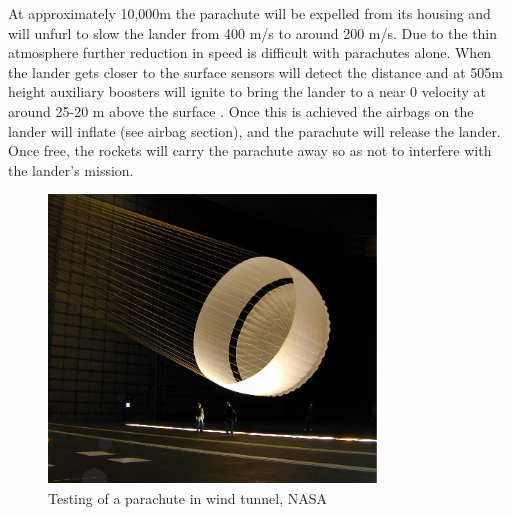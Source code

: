 \documentclass[%
 portrait,
 aapm,
 mph,%
 amsmath,amssymb,
 reprint,%
]{revtex4-2}
\begin{document}
At approximately 10,000m the parachute will be expelled from its housing and will unfurl to slow the lander from 400 m/s to around 200 m/s.  Due to the thin atmosphere further reduction in speed is difficult with parachutes alone.  When the lander gets closer to the surface sensors will detect the distance and at 505m height auxiliary boosters will ignite to bring the lander to a near 0 velocity at around 25-20 m above the surface \cite{NASAMarsExplorationRovers:002}.  Once this is achieved the airbags on the lander will inflate (see airbag section), and the parachute will release the lander.  Once free, the rockets will carry the parachute away so as not to interfere with the lander's mission.
\begin{figure}[h!]
  \includegraphics[width=250pt]{DescentandLanding/yexPara.png}
   \caption{Testing of a parachute in wind tunnel, NASA}
\end{figure} 
\end{document}
